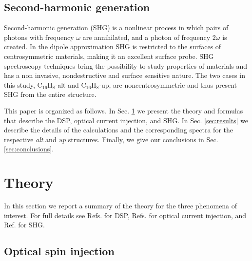 \documentclass[pss]{wiley2sp} %
\begin{document}
\subsection{Second-harmonic generation}
Second-harmonic generation (SHG) is a nonlinear process in which pairs of photons with frequency $\omega$ are annihilated, and a photon of frequency $2\omega$ is created.
In the dipole approximation SHG is restricted to the surfaces of
centrosymmetric materials, making it an excellent surface probe. SHG
spectroscopy techniques bring the possibility to study properties of materials
and has a non invasive, nondestructive and surface sensitive nature.
The two cases in this study,
C$_{16}$H$_{8}$-alt and C$_{16}$H$_{8}$-up, are noncentrosymmetric and thus
present SHG from the entire structure.

This paper is organized as follows. In Sec. \ref{sec:theory} we present the
theory and formulas that describe the DSP, optical current injection, and SHG.
In Sec. \ref{sec:results} we describe the details of the calculations and the
corresponding spectra for the respective \emph{alt} and \emph{up} structures.
Finally, we give our conclusions in Sec. \ref{sec:conclusions}.


\section{Theory}\label{sec:theory}

In this section we report a summary of the theory for the three phenomena of
interest. For full details see Refs. \cite{nastosPRB07,mendozaPRB12} for DSP,
Refs. \cite{cabellosPRB11,sipePRB00} for optical current injection, and Ref.
\cite{andersonPRB15} for SHG.


\subsection{Optical spin injection}\label{sec:theory-DSP}
\end{document}
